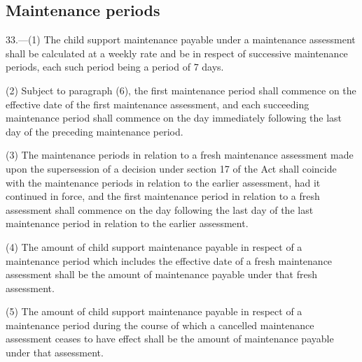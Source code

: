 \documentclass[a4paper,12pt]{article}
\begin{document}
\subsection[33. Maintenance periods]{Maintenance periods}

33.—(1) The child support maintenance payable under a maintenance assessment shall be calculated at a weekly rate and be in respect of successive maintenance periods, each such period being a period of 7 days.

(2) Subject to paragraph (6), the first maintenance period shall commence on the effective date of the first maintenance assessment, and each succeeding maintenance period shall commence on the day immediately following the last day of the preceding maintenance period.

(3) The maintenance periods in relation to a fresh maintenance assessment 
made upon the supersession of a decision under section 17 of the Act  %
shall coincide with the maintenance periods in relation to the earlier assessment, had it continued in force, and the first maintenance period in relation to a fresh assessment shall commence on the day following the last day of the last maintenance period in relation to the earlier assessment.

(4) The amount of child support maintenance payable in respect of a maintenance period which includes the effective date of a fresh maintenance assessment shall be the amount of maintenance payable under that fresh assessment.

(5) The amount of child support maintenance payable in respect of a maintenance period during the course of which a cancelled maintenance assessment ceases to have effect shall be the amount of maintenance payable under that assessment.

\end{document}

